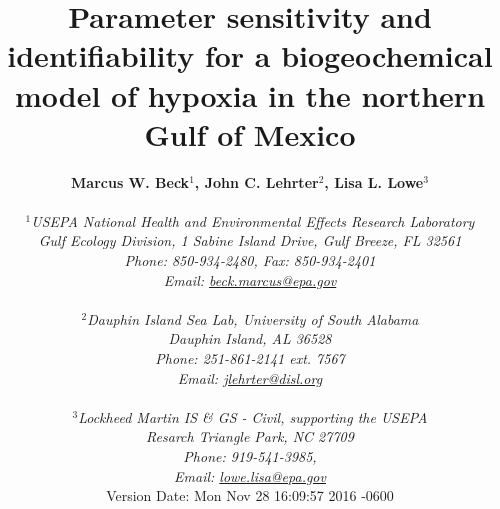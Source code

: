 \documentclass[letterpaper,12pt,oneside]{article}\usepackage[]{graphicx}\usepackage[]{color}
\begin{document}
\raggedbottom
\linenumbers
\raggedright
{}
\setlength{\parindent}{0.5in}
\renewcommand\refname{References \vspace{12pt}}

\begin{singlespace}
\title{{\bf {\Large Parameter sensitivity and identifiability for a biogeochemical model of hypoxia in the northern {G}ulf of {M}exico}}}
\author{
  {\bf {\normalsize Marcus W. Beck$^1$, John C. Lehrter$^2$, Lisa L. Lowe$^3$}}
  \\\\{\textit {\normalsize $^1$USEPA National Health and Environmental Effects Research Laboratory}}
  \\{\textit {\normalsize Gulf Ecology Division, 1 Sabine Island Drive, Gulf Breeze, FL 32561}}
	\\{\textit {\normalsize Phone: 850-934-2480, Fax: 850-934-2401}}
	\\{\textit {\normalsize Email: \href{mailto:beck.marcus@epa.gov}{beck.marcus@epa.gov}}}
	  \\\\{\textit {\normalsize $^2$Dauphin Island Sea Lab, University of South Alabama}}
  \\{\textit {\normalsize Dauphin Island, AL 36528}}
	\\{\textit {\normalsize Phone: 251-861-2141 ext. 7567}}
	\\{\textit {\normalsize Email: \href{mailto:jlehrter@disl.org}{jlehrter@disl.org}}}
	\\\\{\textit {\normalsize $^3$Lockheed Martin IS \& GS - Civil, supporting the USEPA}}
	\\{\textit {\normalsize Resarch Triangle Park, NC 27709}}
	\\{\textit {\normalsize Phone: 919-541-3985,}}
	\\{\textit {\normalsize Email: \href{mailto:lowe.lisa@epa.gov}{lowe.lisa@epa.gov}}}
  \vspace{1in} 
  \\ Version Date:   Mon Nov 28 16:09:57 2016 -0600
	}
\date{}
\maketitle
\end{singlespace}
\clearpage
\end{document}

